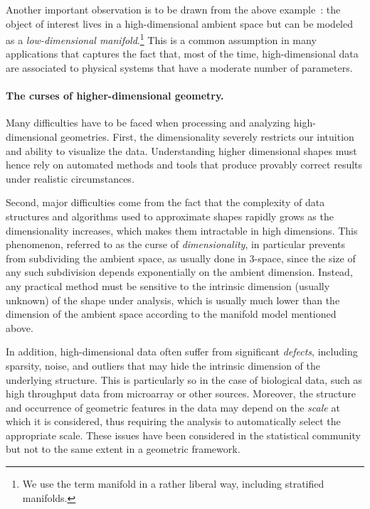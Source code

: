 Another important observation is to be drawn from the above example~: the object of interest lives in a high-dimensional ambient space but can be modeled as a {\em low-dimensional manifold}.\footnote{We use the term manifold in a rather liberal way, including stratified manifolds.} This is a common assumption  in many applications  that captures the fact that, most of the time, high-dimensional data are associated to physical systems that have a moderate number of  parameters.

\paragraph{The curses of higher-dimensional geometry.} 
Many difficulties have to be faced when processing and analyzing
high-dimensional geometries. First, the dimensionality severely restricts our intuition and ability to visualize the data.  Understanding higher dimensional shapes must hence rely on automated methods and tools that produce provably correct results under realistic circumstances.

Second, major difficulties come from the fact that the complexity of data structures and algorithms used to approximate shapes rapidly grows as the dimensionality increases, which makes them intractable in high dimensions.  This phenomenon, referred to as the curse of {\em dimensionality}, in particular prevents from subdividing the ambient space, as usually done in 3-space, since the size of any such subdivision depends exponentially on the ambient dimension. Instead, any practical method must be sensitive to the intrinsic dimension (usually unknown) of the shape under analysis, which is usually much lower than the dimension of the ambient space according to the manifold model mentioned above.

In addition, high-dimensional data often suffer from significant {\em defects}, including sparsity, noise, and outliers that may hide the intrinsic dimension of the underlying structure. This is particularly so in the case of biological data, such as high throughput data from microarray or other sources. Moreover, the structure and occurrence of geometric features in the data may depend on the {\em scale} at which it is considered, thus requiring the analysis to automatically select the appropriate scale.  These issues have been considered in the statistical community but not to the same extent in a geometric framework.

